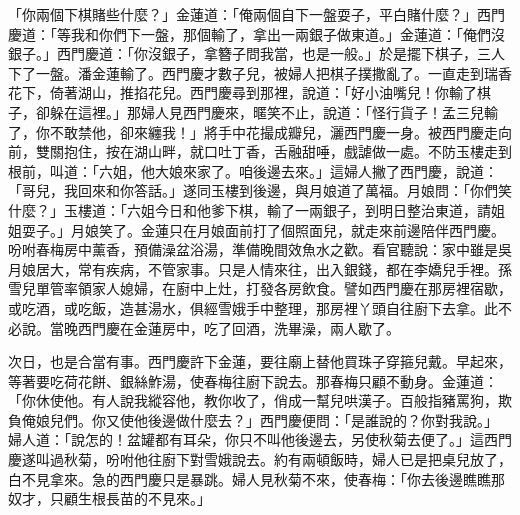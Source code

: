 \begin{showcontents}{}
「你兩個下棋賭些什麼？」金蓮道：「俺兩個自下一盤耍子，平白賭什麼？」西門慶道：「等我和你們下一盤，那個輸了，拿出一兩銀子做東道。」金蓮道：「俺們沒銀子。」西門慶道：「你沒銀子，拿簪子問我當，也是一般。」於是擺下棋子，三人下了一盤。潘金蓮輸了。西門慶才數子兒，被婦人把棋子撲撒亂了。一直走到瑞香花下，倚著湖山，推掐花兒。西門慶尋到那裡，說道：「好小油嘴兒！你輸了棋子，卻躲在這裡。」那婦人見西門慶來，暱笑不止，說道：「怪行貨子！孟三兒輸了，你不敢禁他，卻來纏我！」將手中花撮成瓣兒，灑西門慶一身。被西門慶走向前，雙關抱住，按在湖山畔，就口吐丁香，舌融甜唾，戲謔做一處。不防玉樓走到根前，叫道：「六姐，他大娘來家了。咱後邊去來。」這婦人撇了西門慶，說道：「哥兒，我回來和你答話。」遂同玉樓到後邊，與月娘道了萬福。月娘問：「你們笑什麼？」玉樓道：「六姐今日和他爹下棋，輸了一兩銀子，到明日整治東道，請姐姐耍子。」月娘笑了。金蓮只在月娘面前打了個照面兒，就走來前邊陪伴西門慶。吩咐春梅房中薰香，預備澡盆浴湯，準備晚間效魚水之歡。看官聽說：家中雖是吳月娘居大，常有疾病，不管家事。只是人情來往，出入銀錢，都在李嬌兒手裡。孫雪兒單管率領家人媳婦，在廚中上灶，打發各房飲食。譬如西門慶在那房裡宿歇，或吃酒，或吃飯，造甚湯水，俱經雪娥手中整理，那房裡丫頭自往廚下去拿。此不必說。當晚西門慶在金蓮房中，吃了回酒，洗畢澡，兩人歇了。

次日，也是合當有事。西門慶許下金蓮，要往廟上替他買珠子穿箍兒戴。早起來，等著要吃荷花餅、銀絲鮓湯，使春梅往廚下說去。那春梅只顧不動身。金蓮道： 「你休使他。有人說我縱容他，教你收了，俏成一幫兒哄漢子。百般指豬罵狗，欺負俺娘兒們。你又使他後邊做什麼去？」西門慶便問：「是誰說的？你對我說。」 婦人道：「說怎的！盆罐都有耳朵，你只不叫他後邊去，另使秋菊去便了。」這西門慶遂叫過秋菊，吩咐他往廚下對雪娥說去。約有兩頓飯時，婦人已是把桌兒放了，白不見拿來。急的西門慶只是暴跳。婦人見秋菊不來，使春梅：「你去後邊瞧瞧那奴才，只顧生根長苗的不見來。」


\end{showcontents}

